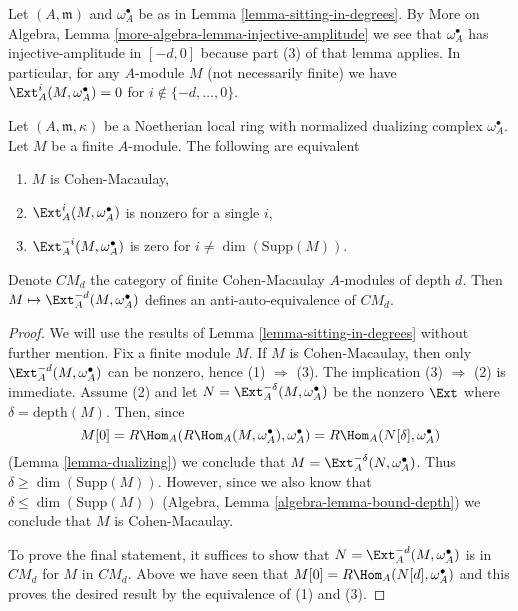 \begin{remark}
\label{remark-vanishing-for-arbitrary-modules}
Let $(A, \mathfrak m)$ and $\omega_A^\bullet$ be as in
Lemma \ref{lemma-sitting-in-degrees}.
By More on Algebra, Lemma \ref{more-algebra-lemma-injective-amplitude}
we see that $\omega_A^\bullet$ has injective-amplitude in $[-d, 0]$
because part (3) of that lemma applies.
In particular, for any $A$-module $M$ (not necessarily finite) we have
$\Ext^i_A(M, \omega_A^\bullet) = 0$ for $i \not \in \{-d, \ldots, 0\}$.
\end{remark}

\begin{lemma}
\label{lemma-local-CM}
Let $(A, \mathfrak m, \kappa)$ be a Noetherian local ring
with normalized dualizing complex $\omega_A^\bullet$. Let $M$
be a finite $A$-module. The following are equivalent
\begin{enumerate}
\item $M$ is Cohen-Macaulay,
\item $\Ext^i_A(M, \omega_A^\bullet)$ is nonzero for a single $i$,
\item $\Ext^{-i}_A(M, \omega_A^\bullet)$ is zero for
$i \not = \dim(\text{Supp}(M))$.
\end{enumerate}
Denote $CM_d$ the category of finite Cohen-Macaulay $A$-modules
of depth $d$. Then $M \mapsto \Ext^{-d}_A(M, \omega_A^\bullet)$
defines an anti-auto-equivalence of $CM_d$.
\end{lemma}

\begin{proof}
We will use the results of Lemma \ref{lemma-sitting-in-degrees}
without further mention. Fix a finite module $M$.
If $M$ is Cohen-Macaulay, then only
$\Ext^{-d}_A(M, \omega_A^\bullet)$ can be nonzero,
hence (1) $\Rightarrow$ (3).
The implication (3) $\Rightarrow$ (2) is immediate.
Assume (2) and let $N = \Ext^{-\delta}_A(M, \omega_A^\bullet)$
be the nonzero $\Ext$ where $\delta = \text{depth}(M)$. Then, since
$$
M[0] = R\Hom_A(R\Hom_A(M, \omega_A^\bullet), \omega_A^\bullet) =
R\Hom_A(N[\delta], \omega_A^\bullet)
$$
(Lemma \ref{lemma-dualizing})
we conclude that $M = \Ext_A^{-\delta}(N, \omega_A^\bullet)$.
Thus $\delta \geq \dim(\text{Supp}(M))$. However,
since we also know that $\delta \leq \dim(\text{Supp}(M))$
(Algebra, Lemma \ref{algebra-lemma-bound-depth}) we conclude that $M$ is
Cohen-Macaulay.

\medskip\noindent
To prove the final statement, it suffices to show that
$N = \Ext^{-d}_A(M, \omega_A^\bullet)$ is in $CM_d$
for $M$ in $CM_d$. Above we have seen that
$M[0] = R\Hom_A(N[d], \omega_A^\bullet)$ and this proves the
desired result by the equivalence of (1) and (3).
\end{proof}

